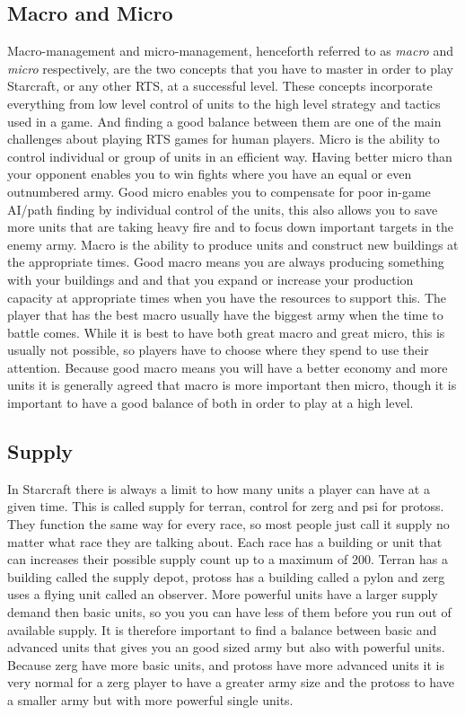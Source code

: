 \subsection{Macro and Micro}
Macro-management and micro-management, henceforth referred to as \textit{macro}
and \textit{micro} respectively, are the two concepts that you have to master
in order to play Starcraft, or any other RTS, at a successful level. These
concepts incorporate everything from low level control of units to the high
level strategy and tactics used in a game. And finding a good balance between
them are one of the main challenges about playing RTS games for human players.
Micro is the ability to control individual or group of units in an efficient
way. Having better micro than your opponent enables you to win fights where you
have an equal or even outnumbered army. Good micro enables you to 
compensate for poor in-game AI/path finding by individual control of the
units, this also allows you to save more units that are taking heavy fire and to
focus down important targets in the enemy army. Macro is the ability to produce
units and construct new buildings at the appropriate times. Good macro means you
are always producing something with your buildings and and that you expand or
increase your production capacity at appropriate times when you have the
resources to support this. The player that has the best macro usually have the
biggest army when the time to battle comes. While it is best to have both great
macro and great micro, this is usually not possible, so players have to choose
where they spend to use their attention. Because good macro means you will have
a better economy and more units it is generally agreed that macro is more
important then micro, though it is important to have a good balance of both in
order to play at a high level.

\subsection{Supply}
In Starcraft there is always a limit to how many units a player can have at a
given time. This is called supply for terran, control for zerg and psi for
protoss. They function the same way for every race, so most people just call it
supply no matter what race they are talking about. Each race has a building or
unit that can increases their possible supply count up to a maximum of 200.
Terran has a building called the supply depot, protoss has a building called a
pylon and zerg uses a flying unit called an observer. More powerful units have a
larger supply demand then basic units, so you you can have less of them before
you run out of available supply. It is therefore important to find a balance
between basic and advanced units that gives you an good sized army but also with
powerful units. Because zerg have more basic units, and protoss have more
advanced units it is very normal for a zerg player to have a greater army size
and the protoss to have a smaller army but with more powerful single units.
 
